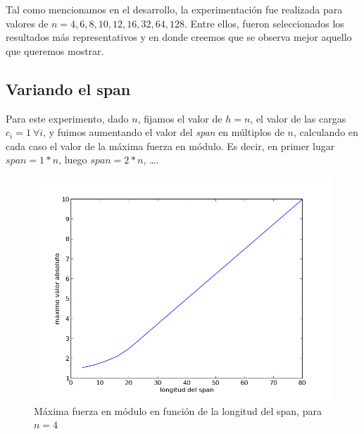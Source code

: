 Tal como mencionamos en el desarrollo, la experimentación fue realizada para valores de $n= 4,6,8,10,12,16,32,64,128$. Entre 
ellos, fueron seleccionados los resultados más representativos y en donde creemos que se observa
mejor aquello que queremos mostrar.

\subsection{Variando el span}

Para este experimento, dado $n$, fijamos el valor de $h=n$, el valor de las cargas $c_{i}=1 \ \forall i$, y fuimos aumentando el
valor del \emph{span} en múltiplos de $n$, calculando en cada caso el valor de la máxima fuerza en módulo. Es decir, en primer lugar
$span=1*n$, luego $span=2*n$, \ldots.

\begin{figure}[!h]
	\begin{center}
		  \includegraphics[scale=0.4]{Imagenes/variable_span/n_4}
		  \caption{Máxima fuerza en módulo en función de la longitud del span, para $n=4$}
		  \label{fig:contra1}
	\end{center}
\end{figure}
\FloatBarrier


